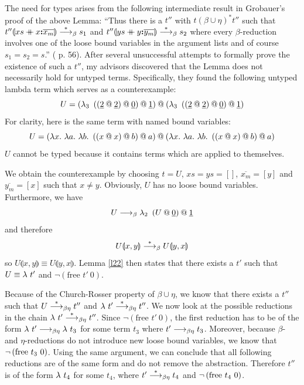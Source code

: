 The need for types arises from the following intermediate result in Grobauer's proof of the above Lemma: ``Thus there is a $t''$ with $t \left( \beta \cup \eta \right)^* t''$ such that $t'' \llparenthesis xs \mathbin{+\mkern-10mu+} x \textbf{:} \overline{x_m} \rrparenthesis \overset{*}{\longrightarrow}_\beta s_1$ and $t'' \llparenthesis ys \mathbin{+\mkern-10mu+} y \textbf{:} \overline{y_m} \rrparenthesis \overset{*}{\longrightarrow}_\beta s_2$ where every $\beta$-reduction involves one of the loose bound variables in the argument lists and of course $s_1 = s_2 = s$.'' (\cite{Grobauer} p. 56). After several unsuccessful attempts to formally prove the existence of such a $t''$, my advisors discovered that the Lemma does not necessarily hold for untyped terms. Specifically, they found the following untyped lambda term which serves as a counterexample:
\[
U = \left( \lambda_{3} \ \left( \left( \underline{2} \mathbin{@} \underline{2} \right) \mathbin{@} \underline{0} \right) \mathbin{@} \underline{1} \right) \mathbin{@} \left( \lambda_{3} \ \left( \left( \underline{2} \mathbin{@} \underline{2} \right) \mathbin{@} \underline{0} \right) \mathbin{@} \underline{1} \right)
\]
For clarity, here is the same term with named bound variables:
\[
	U = \left( \lambda x. \  \lambda a. \ \lambda b. \ \left( \left( x \mathbin{@} x \right) \mathbin{@} b \right) \mathbin{@} a \right) \mathbin{@} 
	\left( \lambda x. \  \lambda a. \ \lambda b. \ \left( \left( x \mathbin{@} x \right) \mathbin{@} b \right) \mathbin{@} a \right)
\]
$U$ cannot be typed because it contains terms which are applied to themselves.

We obtain the counterexample by choosing $t = U$, $xs = ys = []$, $\overline{x_m} = [y]$ and $\overline{y_m} = [x]$ such that $x \neq y$. Obviously, $U$ has no loose bound variables. Furthermore, we have
\[
U \longrightarrow_\beta \lambda_{2} \  \left(U \mathbin{@} \underline{0} \right) \mathbin{@} \underline{1}
\]
and therefore
\[
U \llparenthesis  x, y \rrparenthesis \overset{*}{\longrightarrow}_\beta U \llparenthesis y, x \rrparenthesis
\]
so $U \llparenthesis  x, y \rrparenthesis \equiv U \llparenthesis  y, x \rrparenthesis$. Lemma \ref{l22} then states that there exists a $t'$ such that $U \equiv \lambda \ t'$ and $\neg \left( \text{free } t' \ 0 \right)$.

Because of the Church-Rosser property of $\beta \cup \eta$, we know that there exists a $t''$ such that $U \overset{*}{\longrightarrow}_{\beta\eta} t''$ and $\lambda \ t' \overset{*}{\longrightarrow}_{\beta\eta} t''$. We now look at the possible reductions in the chain $\lambda \ t' \overset{*}{\longrightarrow}_{\beta\eta} t''$. Since $\neg \left( \text{free } t' \ 0 \right)$, the first reduction has to be of the form $\lambda \ t'  \longrightarrow_{\beta\eta} \lambda \ t_3$ for some term $t_3$ where $t' \longrightarrow_{\beta\eta} t_3$. Moreover, because $\beta$- and $\eta$-reductions do not introduce new loose bound variables, we know that $\neg \left( \text{free $t_3$ $0$} \right)$. Using the same argument, we can conclude that all following reductions are of the same form and do not remove the abstraction. Therefore $t''$ is of the form $\lambda \ t_4$ for some $t_4$, where $t' \overset{*}{\longrightarrow}_{\beta\eta} t_4$ and $\neg \left( \text{free $t_4$ $0$} \right)$.


